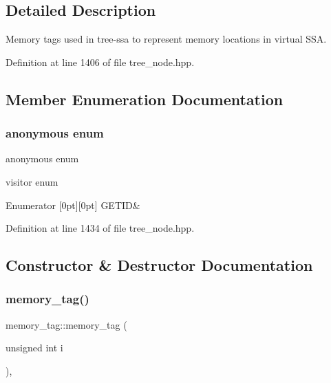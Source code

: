 \subsection{Detailed Description}
Memory tags used in tree-\/ssa to represent memory locations in virtual S\+SA. 

Definition at line 1406 of file tree\+\_\+node.\+hpp.



\subsection{Member Enumeration Documentation}
\mbox{\label{structmemory__tag_a948cb0427c171d04a713d9a1792eb298}} 
\subsubsection{\texorpdfstring{anonymous enum}{anonymous enum}}
{\footnotesize\ttfamily anonymous enum}



visitor enum 

\begin{DoxyEnumFields}{Enumerator}
[0pt][0pt]{}\mbox{\label{structmemory__tag_a948cb0427c171d04a713d9a1792eb298a07e7060e1df9b877efed479f066085bc}} 
G\+E\+T\+ID&\\
\hline

\end{DoxyEnumFields}


Definition at line 1434 of file tree\+\_\+node.\+hpp.



\subsection{Constructor \& Destructor Documentation}
\mbox{\label{structmemory__tag_a6c833828a5666a9f1a730f1c0dacfe75}} 
\subsubsection{\texorpdfstring{memory\+\_\+tag()}{memory\_tag()}}
{\footnotesize\ttfamily memory\+\_\+tag\+::memory\+\_\+tag (\begin{DoxyParamCaption}\item[{unsigned int}]{i }\end{DoxyParamCaption})\hspace{0.3cm}{\ttfamily [inline]}, {\ttfamily [explicit]}}



